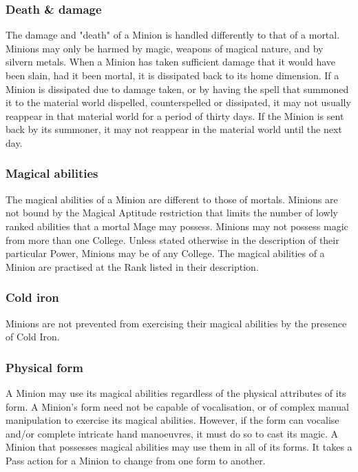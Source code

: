 \subsubsection{Death \& damage}
The damage and "death" of a Minion is handled differently to that of a
mortal.  Minions may only be harmed by magic, weapons of magical
nature, and by silvern metals.  When a Minion has taken sufficient
damage that it would have been slain, had it been mortal, it is
dissipated back to its home dimension.  If a Minion is dissipated due
to damage taken, or by having the spell that summoned it to the
material world dispelled, counterspelled or dissipated, it may not
usually reappear in that material world for a period of thirty days.
If the Minion is sent back by its summoner, it may not reappear in the
material world until the next day.

\subsubsection{Magical abilities}

The magical abilities of a Minion are different to those of
mortals. Minions are not bound by the Magical Aptitude restriction
that limits the number of lowly ranked abilities that a mortal Mage
may possess. Minions may not possess magic from more than one
College. Unless stated otherwise in the description of their
particular Power, Minions may be of any College. The magical abilities
of a Minion are practised at the Rank listed in their description.

\subsubsection{Cold iron}

Minions are not prevented from exercising their magical abilities by the presence of Cold Iron.

\subsubsection{Physical form}

A Minion may use its magical abilities regardless of the physical
attributes of its form.  A Minion's form need not be capable of
vocalisation, or of complex manual manipulation to exercise its
magical abilities.  However, if the form can vocalise and/or complete
intricate hand manoeuvres, it must do so to cast its magic.  A Minion
that possesses magical abilities may use them in all of its forms.  It
takes a Pass action for a Minion to change from one form to another.

